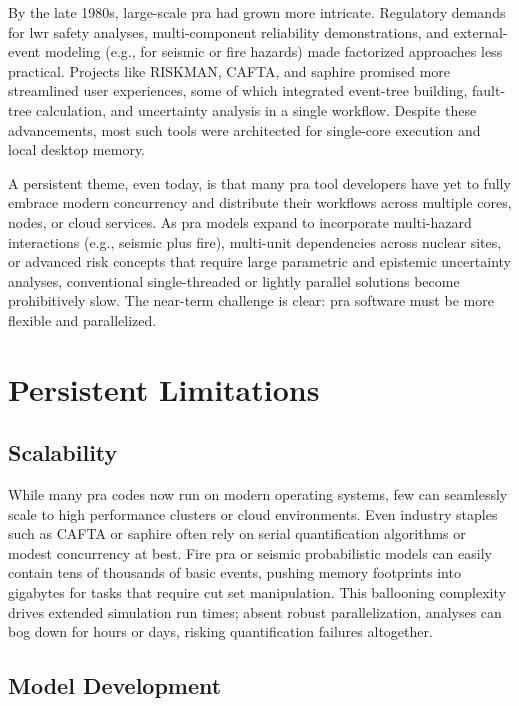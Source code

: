 By the late 1980s, large-scale \acrshort{pra} had grown more intricate. Regulatory demands for \acrshort{lwr} safety analyses, multi-component reliability demonstrations, and external-event modeling (e.g., for seismic or fire hazards) made factorized approaches less practical. Projects like RISKMAN, CAFTA, and \acrshort{saphire} promised more streamlined user experiences, some of which integrated event-tree building, fault-tree calculation, and uncertainty analysis in a single workflow. Despite these advancements, most such tools were architected for single-core execution and local desktop memory.

A persistent theme, even today, is that many \acrshort{pra} tool developers have yet to fully embrace modern concurrency and distribute their workflows across multiple cores, nodes, or cloud services. As \acrshort{pra} models expand to incorporate multi-hazard interactions (e.g., seismic plus fire), multi-unit dependencies across nuclear sites, or advanced risk concepts that require large parametric and epistemic uncertainty analyses, conventional single-threaded or lightly parallel solutions become prohibitively slow. The near-term challenge is clear: \acrshort{pra} software must be more flexible and parallelized.


\section{Persistent Limitations}

\subsection{Scalability}

While many \acrshort{pra} codes now run on modern operating systems, few can seamlessly scale to high performance clusters or cloud environments. Even industry staples such as CAFTA or \acrshort{saphire} often rely on serial quantification algorithms or modest concurrency at best. Fire \acrshort{pra} or seismic probabilistic models can easily contain tens of thousands of basic events, pushing memory footprints into gigabytes for tasks that require cut set manipulation. This ballooning complexity drives extended simulation run times; absent robust parallelization, analyses can bog down for hours or days, risking quantification failures altogether.

\subsection{Model Development}


